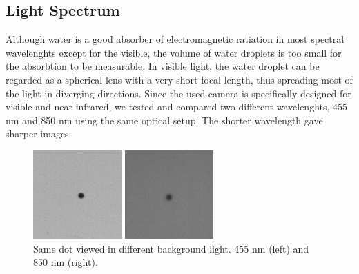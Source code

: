 \subsection{Light Spectrum}

Although water is a good absorber of electromagnetic ratiation in most spectral wavelenghts except for the visible, the volume of water droplets is too small for the absorbtion to be measurable. In visible light, the water droplet can be regarded as a spherical lens with a very short focal length, thus spreading most of the light in diverging directions. Since the used camera is specifically designed for visible and near infrared, we tested and compared two different wavelenghts, 455 nm and 850 nm using the same optical setup. The shorter wavelength gave sharper images.

\begin{figure}
\centering
\begin{minipage}{.5\textwidth}
  \centering
  \includegraphics[width=.6\linewidth]{figures/compare455nmdot}
\end{minipage}%
\begin{minipage}{.5\textwidth}
  \centering
  \includegraphics[width=.6\linewidth]{figures/compare850nmdot}
\end{minipage}
\caption{Same dot viewed in different background light. 455 nm (left) and 850 nm (right).}
\label{fig:comparedots}
\end{figure}

